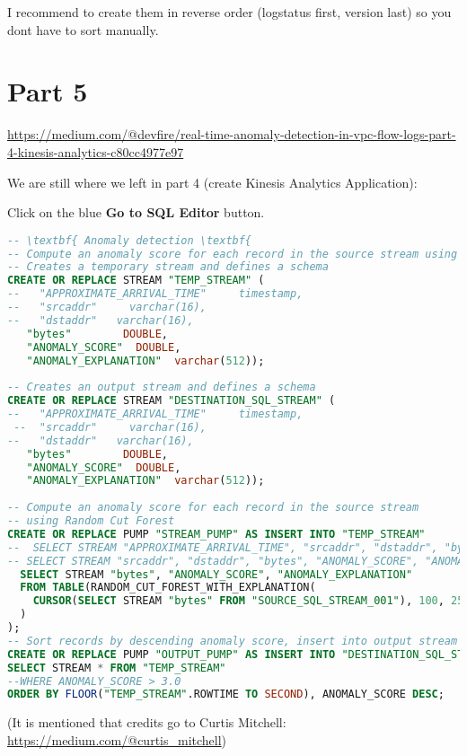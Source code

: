 I recommend to create them in reverse order (log\textunderscore status first, version last) so you dont have to sort manually.


\section{Part 5}
\scriptsize{\url{https://medium.com/@devfire/real-time-anomaly-detection-in-vpc-flow-logs-part-4-kinesis-analytics-c80cc4977e97}}

We are still where we left in part 4 (create Kinesis Analytics Application):

        Click on the blue \textbf{Go to SQL Editor} button.

\begin{lstlisting}[language=sql]
-- \textbf{ Anomaly detection \textbf{
-- Compute an anomaly score for each record in the source stream using Random Cut Forest
-- Creates a temporary stream and defines a schema
CREATE OR REPLACE STREAM "TEMP_STREAM" (
--   "APPROXIMATE_ARRIVAL_TIME"     timestamp,
--   "srcaddr"     varchar(16),
--   "dstaddr"   varchar(16),
   "bytes"        DOUBLE,
   "ANOMALY_SCORE"  DOUBLE,
   "ANOMALY_EXPLANATION"  varchar(512));
   
-- Creates an output stream and defines a schema
CREATE OR REPLACE STREAM "DESTINATION_SQL_STREAM" (
--   "APPROXIMATE_ARRIVAL_TIME"     timestamp,
 --  "srcaddr"     varchar(16),
--   "dstaddr"   varchar(16),
   "bytes"        DOUBLE,
   "ANOMALY_SCORE"  DOUBLE,
   "ANOMALY_EXPLANATION"  varchar(512));
 
-- Compute an anomaly score for each record in the source stream
-- using Random Cut Forest
CREATE OR REPLACE PUMP "STREAM_PUMP" AS INSERT INTO "TEMP_STREAM"
--  SELECT STREAM "APPROXIMATE_ARRIVAL_TIME", "srcaddr", "dstaddr", "bytes", "ANOMALY_SCORE", "ANOMALY_EXPLANATION"
-- SELECT STREAM "srcaddr", "dstaddr", "bytes", "ANOMALY_SCORE", "ANOMALY_EXPLANATION"
  SELECT STREAM "bytes", "ANOMALY_SCORE", "ANOMALY_EXPLANATION" 
  FROM TABLE(RANDOM_CUT_FOREST_WITH_EXPLANATION(
    CURSOR(SELECT STREAM "bytes" FROM "SOURCE_SQL_STREAM_001"), 100, 256, 100000, 1, true
  )
);
-- Sort records by descending anomaly score, insert into output stream
CREATE OR REPLACE PUMP "OUTPUT_PUMP" AS INSERT INTO "DESTINATION_SQL_STREAM"
SELECT STREAM * FROM "TEMP_STREAM"
--WHERE ANOMALY_SCORE > 3.0
ORDER BY FLOOR("TEMP_STREAM".ROWTIME TO SECOND), ANOMALY_SCORE DESC;
\end{lstlisting}

(It is mentioned that credits go to Curtis Mitchell: \scriptsize{\url{https://medium.com/@curtis_mitchell}})

